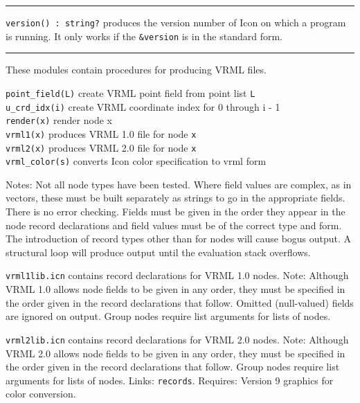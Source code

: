 \vspace{0.25cm}\hrule{}

\texttt{version}\texttt{() : string?} produces the
version number of Icon on which a program is running. It only works if
the \texttt{\&version} is in the standard form. 

\vspace{0.25cm}\hrule{}

These modules contain procedures for producing VRML files.

\texttt{point\_field(L)} create VRML point field from point list
\texttt{L\\
u\_crd\_idx(i)} create VRML coordinate index for 0 through i - 1\\
\texttt{render(x)} render node x\\
\texttt{vrml1(x)} produces VRML 1.0 file for node \texttt{x\\
vrml2(x)} produces VRML 2.0 file for node \texttt{x\\
vrml\_color(s)} converts Icon color specification to vrml form

Notes: Not all node types have been tested. Where field values are
complex, as in vectors, these must be built separately as strings to go
in the appropriate fields. There is no error checking. Fields must be
given in the order they appear in the node record declarations and
field values must be of the correct type and form. The introduction of
record types other than for nodes will cause bogus output. A structural
loop will produce output until the evaluation stack
overflows.

\texttt{vrml1lib.icn} contains record declarations for VRML 1.0 nodes.
Note: Although VRML 1.0 allows node fields to be given in any order,
they must be specified in the order given in the record declarations
that follow. Omitted (null-valued) fields are ignored on output. Group
nodes require list arguments for lists of nodes.

\texttt{vrml2lib.icn} contains record declarations for VRML 2.0 nodes.
Note: Although VRML 2.0 allows node fields to be given in any order,
they must be specified in the order given in the record declarations
that follow. Group nodes require list arguments for lists of nodes. 
Links: \texttt{records}. Requires: Version 9 graphics for color
conversion. 

